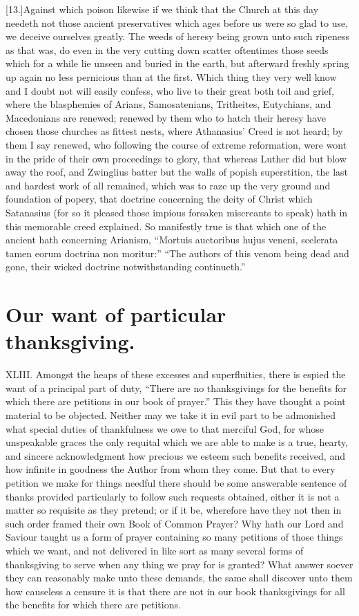 [13.]Against which poison likewise if we think that the Church at this day needeth not those ancient preservatives which ages before us were so glad to use, we deceive ourselves greatly. The weeds of heresy being grown unto such ripeness as that was, do even in the very cutting down scatter oftentimes those seeds which for a while lie unseen and buried in the earth, but afterward freshly spring up again no less pernicious than at the first. Which thing they very well know and I doubt not will easily confess, who live to their great both toil and grief, where the blasphemies of Arians, Samosatenians, Tritheites, Eutychians, and Macedonians are renewed;  renewed by them who to hatch their heresy have chosen those churches as fittest nests, where Athanasius’ Creed is not heard; by them I say renewed, who following the course of extreme reformation, were wont in the pride of their own proceedings to glory, that whereas Luther did but blow away  the roof,
 and Zwinglius batter but the walls of popish superstition, the last and hardest work of all remained, which was to raze up the very ground and foundation of popery, that doctrine concerning the deity of Christ which Satanasius (for so it pleased those impious forsaken miscreants to speak) hath in this memorable creed explained. So manifestly true is that which one of the ancient hath concerning Arianism, “Mortuis auctoribus hujus veneni, scelerata tamen eorum doctrina non moritur:” “The authors of this venom being dead and gone, their wicked doctrine notwithstanding continueth.”


\section*{Our want of particular thanksgiving.}
XLIII. Amongst the heaps of these excesses and superfluities, there is espied the want of a principal part of duty, “There are no thanksgivings for the benefits for which there are petitions in our book of prayer.” This they have thought a point material to be objected. Neither may we take it in evil part to be admonished what special duties of thankfulness we owe to that merciful God, for whose unspeakable graces the only requital which we are able to make is a true, hearty, and sincere acknowledgment how precious we esteem such benefits received, and how infinite in goodness the Author  from whom they come.
 But that to every petition we make for things needful there should be some answerable sentence of thanks provided particularly to follow such requests obtained, either it is not a matter so requisite as they pretend; or if it be, wherefore have they not then in such order framed their own Book of Common Prayer? Why hath our Lord and Saviour taught us a form of prayer containing so many petitions of those things which we want, and not delivered in like sort as many several forms of thanksgiving to serve when any thing we pray for is granted? What answer soever they can reasonably make unto these demands, the same shall discover unto them how causeless a censure it is that there are not in our book thanksgivings for all the benefits for which there are petitions.

